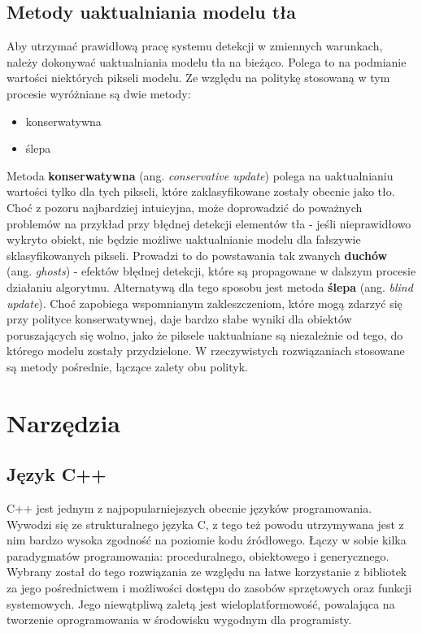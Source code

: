 \subsection{Metody uaktualniania modelu tła}
Aby utrzymać prawidłową pracę systemu detekcji w zmiennych warunkach, należy dokonywać uaktualniania modelu tła na bieżąco. Polega to na podmianie wartości niektórych pikseli modelu. Ze względu na politykę stosowaną w tym procesie wyróżniane są dwie metody:
\begin{itemize}
\item konserwatywna
\item ślepa
\end{itemize} 
Metoda \textbf{konserwatywna} (ang. \textit{conservative update}) polega na uaktualnianiu wartości tylko dla tych pikseli, które zaklasyfikowane zostały obecnie jako tło. Choć z pozoru najbardziej intuicyjna, może doprowadzić do poważnych problemów na przykład przy błędnej detekcji elementów tła - jeśli nieprawidłowo wykryto obiekt, nie będzie możliwe uaktualnianie modelu dla fałszywie sklasyfikowanych pikseli. Prowadzi to do powstawania tak zwanych \textbf{duchów} (ang. \textit{ghosts}) - efektów błędnej detekcji, które są propagowane w dalszym procesie działaniu algorytmu. Alternatywą dla tego sposobu jest metoda \textbf{ślepa} (ang. \textit{blind update}). Choć zapobiega wspomnianym zakleszczeniom, które mogą zdarzyć się przy polityce konserwatywnej, daje bardzo słabe wyniki dla obiektów poruszających się wolno, jako że piksele uaktualniane są niezależnie od tego, do którego modelu zostały przydzielone. W rzeczywistych rozwiązaniach stosowane są metody pośrednie, łączące zalety obu polityk.

\section{Narzędzia}
\subsection{Język C++}
C++ jest jednym z najpopularniejszych obecnie języków programowania. Wywodzi się ze strukturalnego języka C, z tego też powodu utrzymywana jest z nim bardzo wysoka zgodność na poziomie kodu źródłowego. Łączy w sobie kilka paradygmatów programowania: proceduralnego, obiektowego i generycznego. Wybrany został do tego rozwiązania ze względu na łatwe korzystanie z bibliotek za jego pośrednictwem i możliwości dostępu do zasobów sprzętowych oraz funkcji systemowych. Jego niewątpliwą zaletą jest wieloplatformowość, powalająca na tworzenie oprogramowania w środowisku wygodnym dla programisty.
